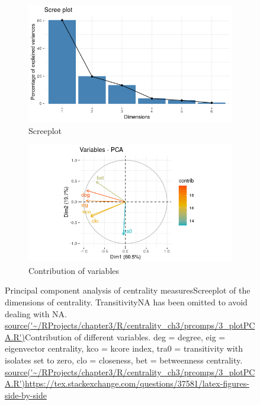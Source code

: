 \begin{figure}
\centering
\begin{subfigure}{.5\textwidth}
  \centering
  \includegraphics[width=.9\linewidth]{images/chapter3/centrality_pca_factoextra/Rplot_screeplot.png}
  \caption{Screeplot}
  \label{fig:sub1}
\end{subfigure}%
\begin{subfigure}{.5\textwidth}
  \centering
  \includegraphics[width=.9\linewidth]{images/chapter3/Rplot_smaller_pca.png}
  \caption{Contribution of variables}
  \label{fig:sub2}
\end{subfigure}
\caption{Principal component analysis of centrality measures{Screeplot of the dimensions of centrality. TransitivityNA has been omitted to avoid dealing with NA. \url{source('~/RProjects/chapter3/R/centrality_ch3/prcomps/3_plotPCA.R')}}Contribution of different variables. deg = degree, eig = eigenvector centrality, kco = kcore index, tra0 = transitivity with isolates set to zero, clo = closeness, bet = betweenness centrality.  \url{source('~/RProjects/chapter3/R/centrality_ch3/prcomps/3_plotPCA.R')}\url{https://tex.stackexchange.com/questions/37581/latex-figures-side-by-side}}
\label{fig:test}
\end{figure}

